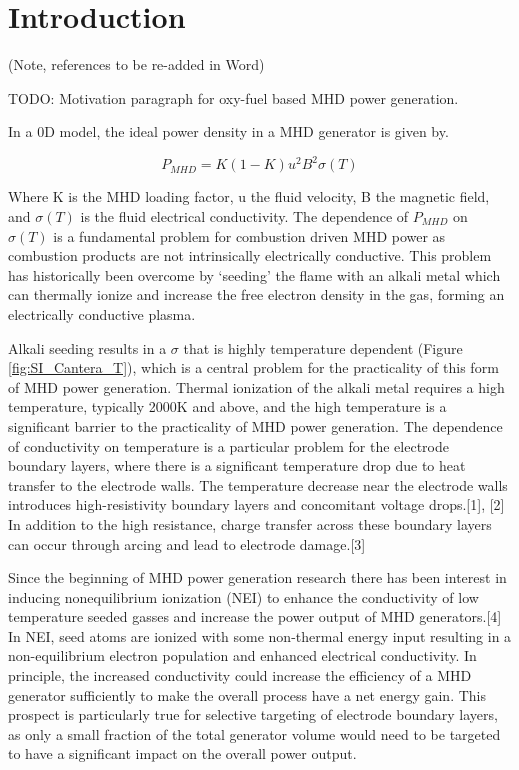

\section{Introduction}

(Note, references to be re-added in Word)

TODO: Motivation paragraph for oxy-fuel based MHD power generation. 

In a 0D model, the ideal power density in a MHD generator is given by. 

\begin{equation}
P_{MHD} = K(1-K) u^2 B^2 \sigma(T)
\label{eq:mhd_ideal_power}
\end{equation}


Where K is the MHD loading factor, u the fluid velocity, B the magnetic field, and $\sigma(T)$ is the fluid electrical conductivity. The dependence of $P_{MHD}$ on $\sigma(T)$ is a fundamental problem for combustion driven MHD power as combustion products are not intrinsically electrically conductive. This problem has historically been overcome by ‘seeding’ the flame with an alkali metal which can thermally ionize and increase the free electron density in the gas, forming an electrically conductive plasma.  

Alkali seeding results in a $\sigma$ that is highly temperature dependent (Figure \ref*{fig:SI_Cantera_T}), which is a central problem for the practicality of this form of MHD power generation. Thermal ionization of the alkali metal requires a high temperature, typically 2000K and above, and the high temperature is a significant barrier to the practicality of MHD power generation. The dependence of conductivity on temperature is a particular problem for the electrode boundary layers, where there is a significant temperature drop due to heat transfer to the electrode walls. The temperature decrease near the electrode walls introduces high-resistivity boundary layers and concomitant voltage drops.[1], [2] In addition to the high resistance, charge transfer across these boundary layers can occur through arcing and lead to electrode damage.[3] 

Since the beginning of MHD power generation research there has been interest in inducing nonequilibrium ionization (NEI) to enhance the conductivity of low temperature seeded gasses and increase the power output of MHD generators.[4] In NEI, seed atoms are ionized with some non-thermal energy input resulting in a non-equilibrium electron population and enhanced electrical conductivity. In principle, the increased conductivity could increase the efficiency of a MHD generator sufficiently to make the overall process have a net energy gain. This prospect is particularly true for selective targeting of electrode boundary layers, as only a small fraction of the total generator volume would need to be targeted to have a significant impact on the overall power output.

